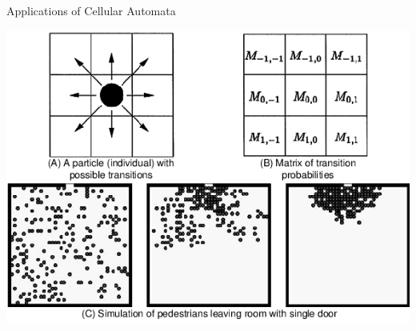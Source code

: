 \begin{frame}{Applications of Cellular Automata}
{        \vfill
        \begin{center}
            \includegraphics[scale=0.6]{lesson_4/images/ca_crowd.png}
        \end{center}
    }
\end{frame}



